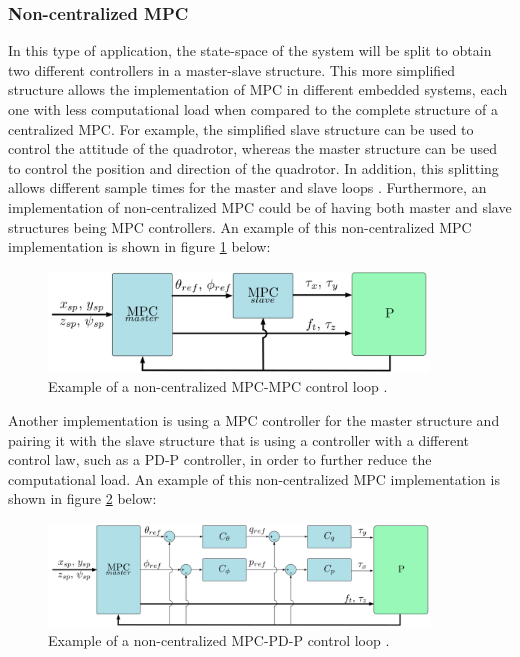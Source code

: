 \documentclass{thesisreport}
\begin{document}
\subsubsection{Non-centralized MPC} 

In this type of application, the state-space of the system will be split to obtain two different controllers in a master-slave structure. This more simplified structure allows the implementation of MPC in different embedded systems, each one with less computational load when compared to the complete structure of a centralized MPC. For example, the simplified slave structure can be used to control the attitude of the quadrotor, whereas the master structure can be used to control the position and direction of the quadrotor. In addition, this splitting allows different sample times for the master and slave loops \cite{Bingfang2004}. Furthermore, an implementation of non-centralized MPC could be of having both master and slave structures being MPC controllers. An example of this non-centralized MPC implementation is shown in figure \ref{fig:non_centralized_mpc_1} below:

\begin{figure}[h]
	\centering
	\includegraphics[width=0.9\textwidth]{Images/Control/MPC/non-centralized_mpc_1.png}
	\caption{Example of a non-centralized MPC-MPC control loop \cite{Alvarez-Valle2019}.}
	\label{fig:non_centralized_mpc_1}
\end{figure}

Another implementation is using a MPC controller for the master structure and pairing it with the slave structure that is using a controller with a different control law, such as a PD-P controller, in order to further reduce the computational load. An example of this non-centralized MPC implementation is shown in figure \ref{fig:non_centralized_mpc_2} below:

\begin{figure}[h]
	\centering
	\includegraphics[width=0.9\textwidth]{Images/Control/MPC/non-centralized_mpc_2.png}
	\caption{Example of a non-centralized MPC-PD-P control loop \cite{Alvarez-Valle2019}.}
	\label{fig:non_centralized_mpc_2}
\end{figure}
\end{document}
